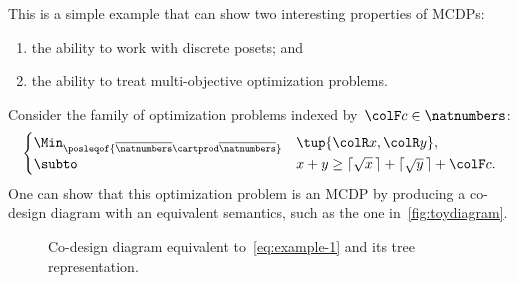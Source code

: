 This is a simple example that can show two interesting properties of MCDPs:
\begin{enumerate}
	\item the ability to work with discrete posets; and
	\item the ability to treat multi-objective optimization problems.
\end{enumerate}
Consider the family of optimization problems indexed by~${\colF c}\in\natnumbers$:
\begin{equation}
	\begin{cases}
		\Min_{\posleqof{\overline{\natnumbers}\cartprod\overline{\natnumbers}}} & \tup{ {\colR x},{\colR y}} ,                                    \\
		\subto                                                                  & x+y\geq\lceil\sqrt{x}\,\rceil+\lceil\sqrt{y}\,\rceil+{\colF c}.
	\end{cases}\label{eq:example-1}
\end{equation}
One can show that this optimization problem is an MCDP by producing a co-design diagram with an equivalent semantics, such as the one in~\cref{fig:toydiagram}.

\begin{figure}[h]

	\caption{Co-design diagram equivalent to~\cref{eq:example-1} and its tree representation.}
\end{figure}

